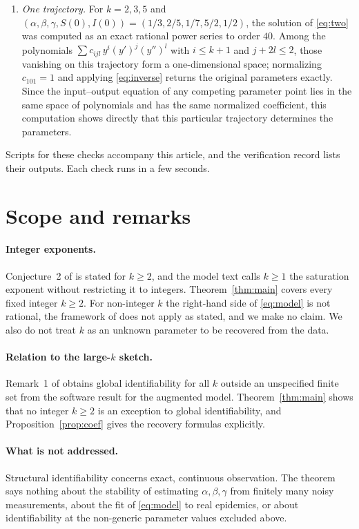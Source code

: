 \documentclass[10pt,a4paper]{article}
\theoremstyle{definition}
\theoremstyle{remark}
\begin{document}
\begin{enumerate}
$(S,u)$; this is consistent with Lemma~\ref{lem:noint} and is not a proof
of it.
\item \emph{One trajectory.} For $k=2,3,5$ and
$(\alpha,\beta,\gamma,S(0),I(0))=(1/3,2/5,1/7,5/2,1/2)$, the solution of
\eqref{eq:two} was computed as an exact rational power series to order
$40$. Among the polynomials $\sum c_{ijl}\,y^i(y')^j(y'')^l$ with
$i\leq k+1$ and $j+2l\leq2$, those vanishing on this trajectory form a
one-dimensional space; normalizing $c_{101}=1$ and applying
\eqref{eq:inverse} returns the original parameters exactly. Since the
input--output equation of any competing parameter point lies in the same
space of polynomials and has the same normalized coefficient, this
computation shows directly that this particular trajectory determines the
parameters.
\end{enumerate}
Scripts for these checks accompany this article, and the verification
record lists their outputs. Each check runs in a few seconds.

\section{Scope and remarks}
\label{sec:scope}
\paragraph{Integer exponents.}
Conjecture~2 of \cite{PSP} is stated for $k\geq2$, and the model text
calls $k\geq1$ the saturation exponent without restricting it to
integers. Theorem~\ref{thm:main} covers every fixed integer $k\geq2$. For
non-integer $k$ the right-hand side of \eqref{eq:model} is not rational,
the framework of \cite{OPT} does not apply as stated, and we make no claim.
We also do not treat $k$ as an unknown parameter to be recovered from the
data.

\paragraph{Relation to the large-$k$ sketch.}
Remark~1 of \cite[Section~S9]{PSPsupp} obtains global identifiability for
all $k$ outside an unspecified finite set from the software result for
the augmented model. Theorem~\ref{thm:main} shows that no integer $k\geq2$
is an exception to global identifiability, and
Proposition~\ref{prop:coef} gives the recovery formulas explicitly.

\paragraph{What is not addressed.}
Structural identifiability concerns exact, continuous observation. The
theorem says nothing about the stability of estimating $\alpha,\beta,\gamma$
from finitely many noisy measurements, about the fit of
\eqref{eq:model} to real epidemics, or about identifiability at the
non-generic parameter values excluded above.
\end{document}
